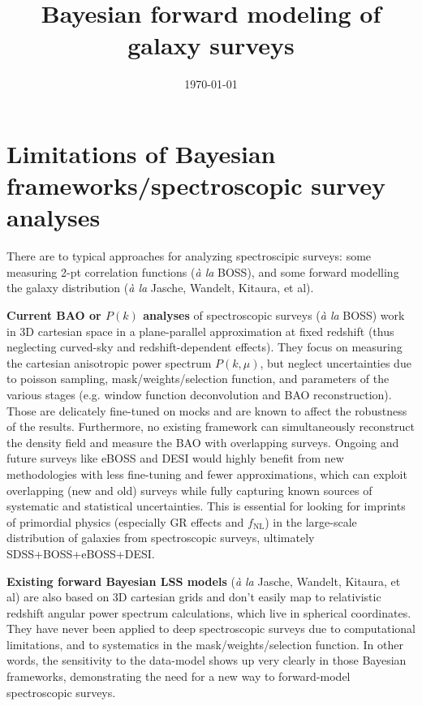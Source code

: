 \documentclass{aastex6}
\begin{document}
 
\title{Bayesian forward modeling of galaxy surveys} 
\author{}
\date{\today}
\maketitle

\vspace*{-1cm}
\section{Limitations of  Bayesian frameworks/spectroscopic survey analyses}
 
 There are to typical approaches for analyzing spectroscipic surveys: some measuring 2-pt correlation functions (\textit{\`a la} BOSS), and some forward modelling the galaxy distribution (\textit{\`a la} Jasche, Wandelt, Kitaura, et al).
 
\textbf{Current BAO or $P(k)$ analyses} of spectroscopic surveys (\textit{\`a la} BOSS) work in 3D cartesian space in a plane-parallel approximation at fixed redshift (thus neglecting curved-sky and redshift-dependent effects). 
They focus on measuring the cartesian anisotropic power spectrum $P(k, \mu)$, but neglect uncertainties due to poisson sampling, mask/weights/selection function, and parameters of the various stages (e.g. window function deconvolution and BAO reconstruction). 
Those are delicately fine-tuned on mocks and are known to affect the robustness of the results. 
Furthermore, no existing framework can simultaneously reconstruct the density field and measure the BAO with overlapping surveys. 
Ongoing and future surveys like eBOSS and DESI would highly benefit from new methodologies with less fine-tuning and fewer approximations, which can exploit overlapping (new and old) surveys while fully capturing known sources of systematic and statistical uncertainties. 
This is essential for looking for imprints of primordial physics (especially GR effects and $f_{\mathrm{NL}}$) in the large-scale distribution of galaxies from spectroscopic surveys, ultimately SDSS+BOSS+eBOSS+DESI.

\textbf{Existing forward Bayesian LSS models} (\textit{\`a la} Jasche, Wandelt, Kitaura, et al) are also based on 3D cartesian grids and don't easily map to relativistic redshift angular power spectrum calculations, which live in spherical coordinates. 
They have never been applied to deep spectroscopic surveys due to computational limitations, and to systematics in the mask/weights/selection function.
In other words, the sensitivity to the data-model shows up very clearly in those Bayesian frameworks, demonstrating the need for a new way to forward-model spectroscopic surveys.
\end{document}
